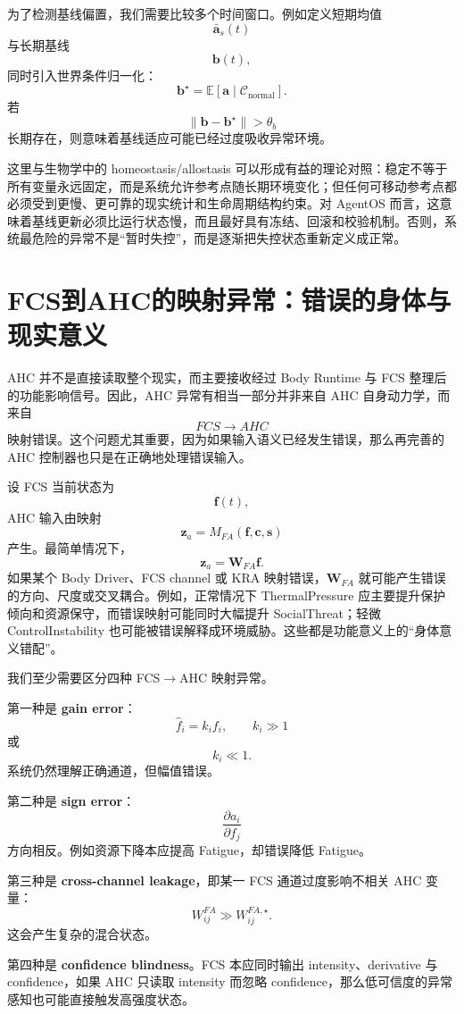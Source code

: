 为了检测基线偏置，我们需要比较多个时间窗口。例如定义短期均值
\[
\bar{\mathbf a}_s(t)
\]
与长期基线
\[
\mathbf b(t),
\]
同时引入世界条件归一化：
\[
\mathbf b^\star
=
\mathbb E
\left[
\mathbf a
\mid
\mathcal C_{\mathrm{normal}}
\right].
\]
若
\[
\|\mathbf b-\mathbf b^\star\|
>
\theta_b
\]
长期存在，则意味着基线适应可能已经过度吸收异常环境。

这里与生物学中的 homeostasis/allostasis 可以形成有益的理论对照：稳定不等于所有变量永远固定，而是系统允许参考点随长期环境变化；但任何可移动参考点都必须受到更慢、更可靠的现实统计和生命周期结构约束。对 AgentOS 而言，这意味着基线更新必须比运行状态慢，而且最好具有冻结、回滚和校验机制。否则，系统最危险的异常不是“暂时失控”，而是逐渐把失控状态重新定义成正常。

\section{FCS到AHC的映射异常：错误的身体与现实意义}
\label{sec:fcs_ahc_mapping_error}

AHC 并不是直接读取整个现实，而主要接收经过 Body Runtime 与 FCS 整理后的功能影响信号。因此，AHC 异常有相当一部分并非来自 AHC 自身动力学，而来自
\[
FCS
\rightarrow
AHC
\]
映射错误。这个问题尤其重要，因为如果输入语义已经发生错误，那么再完善的 AHC 控制器也只是在正确地处理错误输入。

设 FCS 当前状态为
\[
\mathbf f(t),
\]
AHC 输入由映射
\[
\mathbf z_a
=
M_{FA}
\left(
\mathbf f,
\mathbf c,
\mathbf s
\right)
\]
产生。最简单情况下，
\[
\mathbf z_a
=
\mathbf W_{FA}\mathbf f.
\]
如果某个 Body Driver、FCS channel 或 KRA 映射错误，$\mathbf W_{FA}$ 就可能产生错误的方向、尺度或交叉耦合。例如，正常情况下 ThermalPressure 应主要提升保护倾向和资源保守，而错误映射可能同时大幅提升 SocialThreat；轻微 ControlInstability 也可能被错误解释成环境威胁。这些都是功能意义上的“身体意义错配”。

我们至少需要区分四种 FCS$\rightarrow$AHC 映射异常。

第一种是 \textbf{gain error}：
\[
\hat f_i
=
k_i f_i,
\qquad
k_i\gg1
\]
或
\[
k_i\ll1.
\]
系统仍然理解正确通道，但幅值错误。

第二种是 \textbf{sign error}：
\[
\frac{\partial a_i}{\partial f_j}
\]
方向相反。例如资源下降本应提高 Fatigue，却错误降低 Fatigue。

第三种是 \textbf{cross-channel leakage}，即某一 FCS 通道过度影响不相关 AHC 变量：
\[
W_{ij}^{FA}
\gg
W_{ij}^{FA,\star}.
\]
这会产生复杂的混合状态。

第四种是 \textbf{confidence blindness}。FCS 本应同时输出 intensity、derivative 与 confidence，如果 AHC 只读取 intensity 而忽略 confidence，那么低可信度的异常感知也可能直接触发高强度状态。

